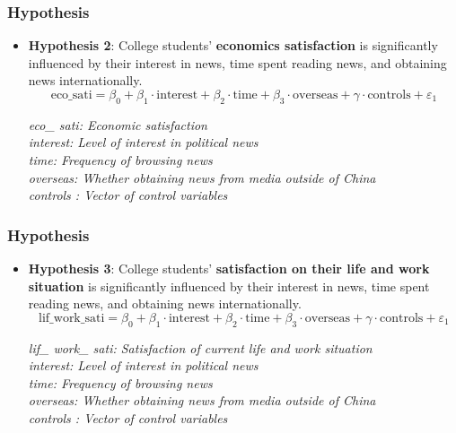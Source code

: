 \documentclass{beamer}
\begin{document}
\begin{frame}
\frametitle{Hypothesis}

\begin{itemize}
    \item<1-> \textbf{Hypothesis 2}: College students' \textbf{economics satisfaction} is significantly influenced by their interest in news, time spent reading news, and obtaining news internationally.
\begin{equation}
\text{eco\_sati} = \beta_0 + \beta_1 \cdot \text{interest} + \beta_2 \cdot \text{time} + \beta_3 \cdot \text{overseas} + \gamma \cdot \text{controls} + \varepsilon_1
\end{equation}

\textit{\small{eco\_ sati: Economic satisfaction\\
interest: Level of interest in political news\\
time: Frequency of browsing news\\
overseas: Whether obtaining news from media outside of China\\
controls : Vector of control variables}}
\end{itemize}
\end{frame}

\begin{frame}
\frametitle{Hypothesis}

\begin{itemize}
    \item<1-> \textbf{Hypothesis 3}: College students' \textbf{satisfaction on their life and work situation} is significantly influenced by their interest in news, time spent reading news, and obtaining news internationally.
\begin{equation}
\text{lif\_ work\_ sati} = \beta_0 + \beta_1 \cdot \text{interest} + \beta_2 \cdot \text{time} + \beta_3 \cdot \text{overseas} + \gamma \cdot \text{controls} + \varepsilon_1
\end{equation}

\textit{\small{lif\_ work\_ sati: Satisfaction of current life and work situation\\
interest: Level of interest in political news\\
time: Frequency of browsing news\\
overseas: Whether obtaining news from media outside of China\\
controls : Vector of control variables}}
\end{itemize}
\end{frame}
\end{document}
